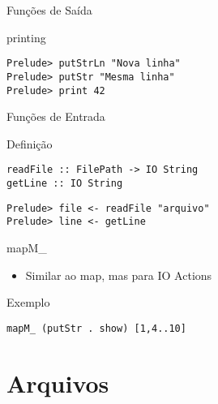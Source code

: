 \documentclass{beamer}
\begin{document}
		\begin{frame}[fragile]{Funções de Saída}
		 \begin{block}{printing}
		  \begin{lstlisting}
Prelude> putStrLn "Nova linha"
Prelude> putStr "Mesma linha"
Prelude> print 42
		  \end{lstlisting}
		 \end{block}
		\end{frame}
		
		\begin{frame}[fragile]{Funções de Entrada}

		 \begin{block}{Definição}
		  \begin{lstlisting}
readFile :: FilePath -> IO String
getLine :: IO String
		  \end{lstlisting}
		 \end{block}
		 
		 \begin{block}{}
		  \begin{lstlisting}
Prelude> file <- readFile "arquivo"
Prelude> line <- getLine
		  \end{lstlisting}
		 \end{block}		 
		\end{frame}
		
		\begin{frame}[fragile]{mapM\_}
		\begin{itemize}
		 \item Similar ao map, mas para IO Actions
		\end{itemize}

		 \begin{block}{Exemplo}
		  \begin{lstlisting}
mapM_ (putStr . show) [1,4..10]
		  \end{lstlisting}
		 \end{block}

		\end{frame}


	\section{Arquivos}
	
	\begin{frame}{}
	\end{frame}
	
\end{document}
